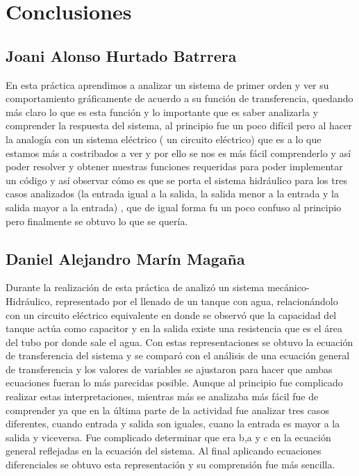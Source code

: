 \documentclass[12pt]{article}
\begin{document}
	\section{Conclusiones}
	\subsection{Joani Alonso Hurtado Batrrera}
	En esta práctica aprendimos a analizar un sistema de primer orden y ver su comportamiento gráficamente de acuerdo a su función de transferencia, quedando más claro lo que es esta función y lo importante que es saber analizarla y comprender la respuesta del sistema, al principio fue un poco difícil pero al hacer la analogía con un sistema eléctrico ( un circuito eléctrico) que es a lo que estamos más a costribados a ver y por ello se nos es más fácil comprenderlo y así poder resolver y obtener nuestras funciones requeridas para poder implementar un código y así observar cómo es que se porta el sistema hidráulico para los tres casos analizados (la entrada igual a la salida, la salida menor a la entrada y la salida mayor a la entrada) , que de igual forma fu un poco confuso al principio pero finalmente se obtuvo lo que se quería.
	
	\subsection{Daniel Alejandro Marín Magaña}
	Durante la realización de esta práctica de analizó un sistema mecánico-Hidráulico, representado por el llenado de un tanque con agua, relacionándolo con un circuito eléctrico equivalente en donde se observó que la capacidad del tanque actúa como capacitor y en la salida existe una resistencia que es el área del tubo por donde sale el agua. Con estas representaciones se obtuvo la ecuación de transferencia del sistema y se comparó con el análisis de una ecuación general de transferencia y los valores de variables se ajustaron para hacer que ambas ecuaciones fueran lo más parecidas posible. Aunque al principio fue complicado realizar estas interpretaciones, mientras más se analizaba más fácil fue de comprender ya que en la última parte de la actividad fue analizar tres casos diferentes, cuando entrada y salida son iguales, cuano la entrada es mayor a la salida y viceversa. Fue complicado determinar que era b,a y c en la ecuación general reflejadas en la ecuación del sistema. Al final aplicando ecuaciones diferenciales se obtuvo esta representación y su comprensión fue más sencilla.
	
	
	
\end{document}
